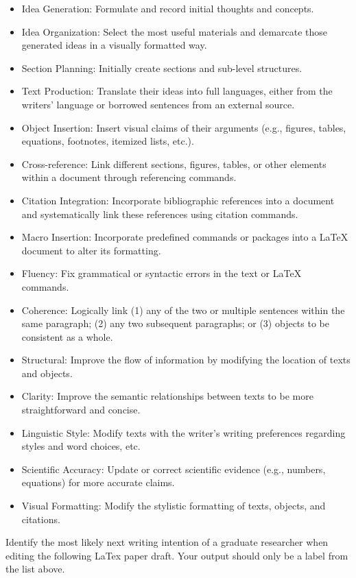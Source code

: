 \begin{itemize}
    \item Idea Generation: Formulate and record initial thoughts and concepts.
    \item Idea Organization: Select the most useful materials and demarcate those generated ideas in a visually formatted way.
    \item Section Planning: Initially create sections and sub-level structures.
    \item Text Production: Translate their ideas into full languages, either from the writers' language or borrowed sentences from an external source. 
    \item Object Insertion: Insert visual claims of their arguments (e.g., figures, tables, equations, footnotes, itemized lists, etc.). 
    \item Cross-reference: Link different sections, figures, tables, or other elements within a document through referencing commands. 
    \item Citation Integration: Incorporate bibliographic references into a document and systematically link these references using citation commands. 
    \item Macro Insertion: Incorporate predefined commands or packages into a LaTeX document to alter its formatting. 
    \item Fluency: Fix grammatical or syntactic errors in the text or LaTeX commands.
    \item Coherence: Logically link (1) any of the two or multiple sentences within the same paragraph; (2) any two subsequent paragraphs; or (3) objects to be consistent as a whole. 
    \item Structural: Improve the flow of information by modifying the location of texts and objects. 
    \item Clarity: Improve the semantic relationships between texts to be more straightforward and concise. 
    \item Linguistic Style: Modify texts with the writer's writing preferences regarding styles and word choices, etc. 
    \item Scientific Accuracy: Update or correct scientific evidence (e.g., numbers, equations) for more accurate claims. 
    \item Visual Formatting: Modify the stylistic formatting of texts, objects, and citations.
\end{itemize}

Identify the most likely next writing intention of a graduate researcher when editing the following LaTex paper draft. Your output should only be a label from the list above.


